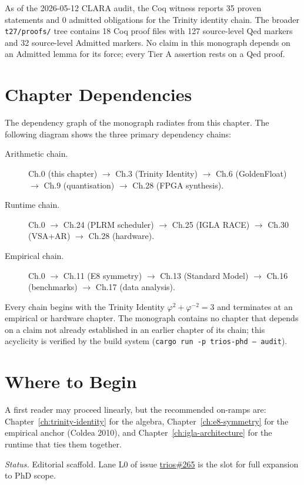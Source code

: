 As of the 2026-05-12 CLARA audit, the Coq witness reports 35 proven statements and 0 admitted obligations for the Trinity identity chain. The broader \texttt{t27/proofs/} tree contains 18 Coq proof files with 127 source-level Qed markers and 32 source-level Admitted markers. No claim in this monograph depends on an Admitted lemma for its force; every Tier A assertion rests on a Qed proof.

\section{Chapter Dependencies}

The dependency graph of the monograph radiates from this chapter. The following diagram shows the three primary dependency chains:

\begin{description}
  \item[Arithmetic chain.] Ch.0 (this chapter) \(\to\) Ch.3 (Trinity Identity) \(\to\) Ch.6 (GoldenFloat) \(\to\) Ch.9 (quantisation) \(\to\) Ch.28 (FPGA synthesis).
  \item[Runtime chain.] Ch.0 \(\to\) Ch.24 (PLRM scheduler) \(\to\) Ch.25 (IGLA RACE) \(\to\) Ch.30 (VSA+AR) \(\to\) Ch.28 (hardware).
  \item[Empirical chain.] Ch.0 \(\to\) Ch.11 (E8 symmetry) \(\to\) Ch.13 (Standard Model) \(\to\) Ch.16 (benchmarks) \(\to\) Ch.17 (data analysis).
\end{description}

Every chain begins with the Trinity Identity \(\varphi^2 + \varphi^{-2} = 3\) and terminates at an empirical or hardware chapter. The monograph contains no chapter that depends on a claim not already established in an earlier chapter of its chain; this acyclicity is verified by the build system (\texttt{cargo run -p trios-phd -- audit}).

\section{Where to Begin}

A first reader may proceed linearly, but the recommended on-ramps are:
Chapter~\ref{ch:trinity-identity} for the algebra,
Chapter~\ref{ch:e8-symmetry} for the empirical anchor (Coldea 2010),
and Chapter~\ref{ch:igla-architecture} for the runtime that ties
them together.

\smallskip

\noindent \emph{Status.} Editorial scaffold. Lane L0 of issue
\href{https://github.com/gHashTag/trios/issues/265}{trios\#265} is
the slot for full expansion to PhD scope.

